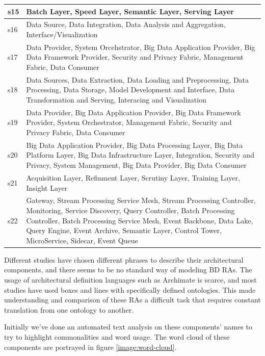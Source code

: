 \documentclass{ieeeaccess}
\begin{document}
\begin{table}
\begin{tabular}{|p{0.5cm}|p{16.5cm}|}
        \hline
        s15 & Batch Layer, Speed Layer, Semantic Layer, Serving Layer \\
        \hline
        s16 & Data Source, Data Integration, Data Analysis and Aggregation, Interface/Visualization \\
        \hline
        s17 & Data Provider, System Orcehstrator, Big Data Application Provider, Big Data Framework Provider, Security and Privacy Fabric, Management Fabric, Data Consumer \\
        \hline
        s18 & Data Sources, Data Extraction, Data Loading and Preprocessing, Data Processing, Data Storage, Model Development and Interface, Data Transformation and Serving, Interacing and Visualization \\
        \hline
        s19 & Data Provider, Big Data Application Provider, Big Data Framework Provider, System Orchestrator, Management Fabric, Security and Privacy Fabric, Data Consumer \\
        \hline
        s20 & Big Data Application Provider, Big Data Processing Layer, Big Data Platform Layer, Big Data Infrastructure Layer, Integration, Security and Privacy, System Management, Big Data Provider, Big Data Consumer \\
        \hline
        s21 & Acquisition Layer, Refinment Layer, Scrutiny Layer, Training Layer, Insight Layer \\
        \hline
        s22 & Gateway, Stream Processing Service Mesh, Stream Processing Controller, Monitoring, Service Discovery, Query Controller, Batch Processing Controller, Batch Processing Service Mesh, Event Backbone, Data Lake, Query Engine, Event Archive, Semantic Layer, Control Tower, MicroService, Sidecar, Event Queue  \\
        \hline
    \end{tabular}
\end{table}

Different studies have chosen different phrases to describe their architectural components, and there seems to be no standard way of modeling BD RAs. The usage of architectural definition languages such as Archimate is scarce, and most studies have used boxes and lines with specifically defined ontologies. This made understanding and comparison of these RAs a difficult task that requires constant translation from one ontology to another. 

Initially we've done an automated text analysis on these components' names to try to highlight commonalities and word usage. The word cloud of these components are portrayed in figure \ref{image:word-cloud}.
\end{document}
